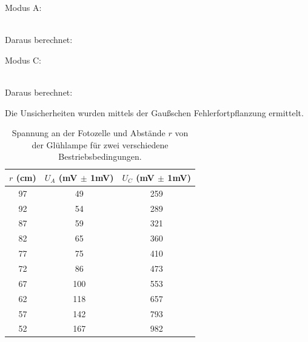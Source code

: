 \documentclass[12pt,a4paper,twopage]{article}
\begin{document}
Modus A: \begin{center}

 \\

Daraus berechnet:\\
 \end{center}
Modus C: \begin{center}  \\

Daraus berechnet:\\
\end{center}
Die Unsicherheiten wurden mittels der Gaußschen Fehlerfortpflanzung ermittelt.\\
\begin{table}[H]
\begin{center}
\begin{tabular}{|c|c|c|}
\hline
$r$ (cm) & $U_A$ (mV $\pm$ 1mV) & $U_C$ (mV $\pm$ 1mV)\\
\hline
97 & 49 & 259 \\
92 & 54 & 289 \\
87 & 59 & 321 \\
82 & 65 & 360 \\
77 & 75 & 410 \\
72 & 86 & 473 \\
67 & 100 & 553 \\
62 & 118 & 657 \\
57 & 142 & 793 \\
52 & 167 & 982 \\
\hline
\hline
\end{tabular}
\caption{Spannung an der Fotozelle und Abstände $r$ von der Glühlampe für zwei verschiedene Bestriebsbedingungen.}
\end{center}
\end{table}

\end{document}
